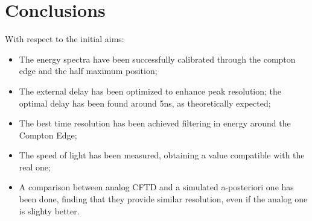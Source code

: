 \documentclass[11pt,a4 paper]{article}
\begin{document}
\section{Conclusions}
With respect to the initial aims:
\begin{itemize}[noitemsep]
    \item The energy spectra have been successfully calibrated through the compton edge and the half maximum position;
    \item The external delay has been optimized to enhance peak resolution; the optimal delay has been found around 5ns, as theoretically expected;
    \item The best time resolution has been achieved filtering in energy around the Compton Edge;
    \item The speed of light has been measured, obtaining a value compatible with the real one;
    \item A comparison between analog CFTD and a simulated a-posteriori one has been done, finding that they provide similar resolution, even if the analog one is slighty better.
\end{itemize}
\end{document}
